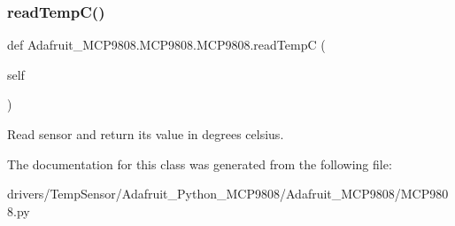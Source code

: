 \subsubsection{\texorpdfstring{read\+Temp\+C()}{readTempC()}}
{\footnotesize\ttfamily def Adafruit\+\_\+\+M\+C\+P9808.\+M\+C\+P9808.\+M\+C\+P9808.\+read\+TempC (\begin{DoxyParamCaption}\item[{}]{self }\end{DoxyParamCaption})}

\begin{DoxyVerb}Read sensor and return its value in degrees celsius.\end{DoxyVerb}
 

The documentation for this class was generated from the following file\+:\begin{DoxyCompactItemize}
\item 
drivers/\+Temp\+Sensor/\+Adafruit\+\_\+\+Python\+\_\+\+M\+C\+P9808/\+Adafruit\+\_\+\+M\+C\+P9808/M\+C\+P9808.\+py\end{DoxyCompactItemize}

